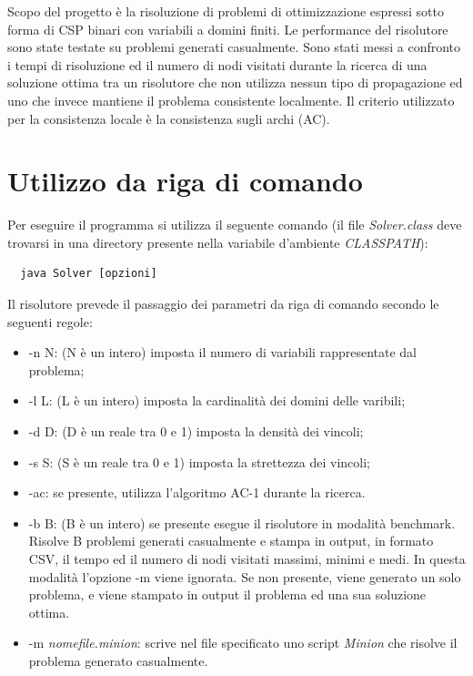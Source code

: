 \documentclass[a4paper,12pt,italian]{article}
\begin{document}
Scopo del progetto \`e la risoluzione di problemi di ottimizzazione
espressi sotto forma di CSP binari con variabili a domini finiti. Le
performance del risolutore sono state testate su problemi generati
casualmente. Sono stati messi a confronto i tempi di risoluzione ed il
numero di nodi visitati durante la ricerca di una soluzione ottima tra
un risolutore che non utilizza nessun tipo di propagazione ed uno che
invece mantiene il problema consistente localmente. Il criterio
utilizzato per la consistenza locale \`e la consistenza sugli archi
(AC).

\section{Utilizzo da riga di comando}

Per eseguire il programma si utilizza il seguente comando (il file
\textit{Solver.class} deve trovarsi in una directory presente nella
variabile d'ambiente \textit{CLASSPATH}):
\begin{verbatim}
  java Solver [opzioni]
\end{verbatim}

Il risolutore prevede il passaggio dei parametri da riga di comando secondo
le seguenti regole:

\begin{itemize}
 \item -n N: (N \`e un intero) imposta il numero di variabili rappresentate dal problema;
 \item -l L: (L \`e un intero) imposta la cardinalit\`a dei domini delle varibili;
 \item -d D: (D \`e un reale tra 0 e 1) imposta la densit\`a dei vincoli;
 \item -s S: (S \`e un reale tra 0 e 1) imposta la strettezza dei vincoli;
 \item -ac: se presente, utilizza l'algoritmo AC-1 durante la ricerca.
 \item -b B: (B \`e un intero) se presente esegue il risolutore in
   modalit\`a benchmark. Risolve B problemi generati casualmente e
   stampa in output, in formato CSV, il tempo ed il numero di nodi
   visitati massimi, minimi e medi. In questa modalit\`a l'opzione -m
   viene ignorata. Se non presente, viene generato un solo problema, e
   viene stampato in output il problema ed una sua soluzione ottima.
 \item -m \textit{nomefile.minion}: scrive nel file specificato uno
   script \textit{Minion} che risolve il problema generato casualmente.
\end{itemize}
\end{document}
